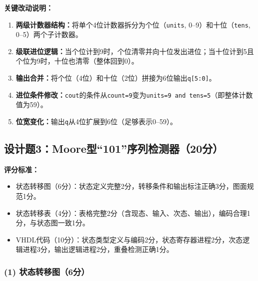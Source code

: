 \noindent\textbf{关键改动说明：}
\begin{enumerate}
  \item \textbf{两级计数器结构：}将单个4位计数器拆分为个位（\texttt{units}, 0--9）和十位（\texttt{tens}, 0--5）两个子计数器。
  \item \textbf{级联进位逻辑：}当个位计到9时，个位清零并向十位发出进位；当十位计到5且个位为9时，十位也清零（整体回到0）。
  \item \textbf{输出合并：}将个位（4位）和十位（2位）拼接为6位输出\texttt{q[5:0]}。
  \item \textbf{进位条件修改：}\texttt{cout}的条件从\texttt{count=9}变为\texttt{units=9 and tens=5}（即整体计数值为59）。
  \item \textbf{位宽变化：}输出\texttt{q}从4位扩展到6位（足够表示0--59）。
\end{enumerate}

\subsection*{设计题3：Moore型``101''序列检测器（20分）}

\begin{framed}
\textbf{评分标准：}
\begin{itemize}
  \item 状态转移图（6分）：状态定义完整2分，转移条件和输出标注正确3分，图面规范1分。
  \item 状态转移表（4分）：表格完整2分（含现态、输入、次态、输出），编码合理1分，与状态图一致1分。
  \item VHDL代码（10分）：状态类型定义与编码2分，状态寄存器进程2分，次态逻辑进程3分，输出逻辑进程2分，重叠检测正确1分。
\end{itemize}
\end{framed}

\subsubsection*{(1) 状态转移图（6分）}

